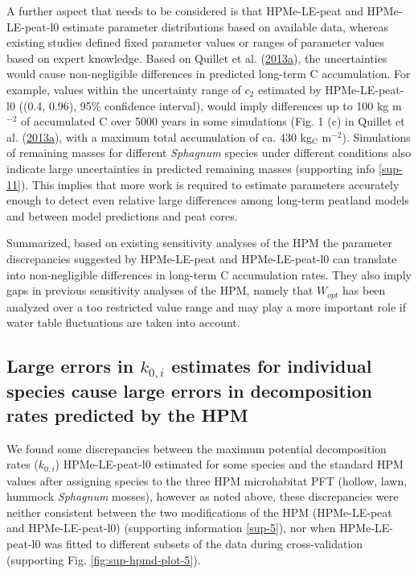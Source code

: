 \documentclass[
  12pt,
]{article}
\begin{document}
A further aspect that needs to be considered is that HPMe-LE-peat and HPMe-LE-peat-l0 estimate parameter distributions based on available data, whereas existing studies defined fixed parameter values or ranges of parameter values based on expert knowledge. Based on Quillet et al. (\protect\hyperlink{ref-Quillet.2013}{2013a}), the uncertainties would cause non-negligible differences in predicted long-term C accumulation. For example, values within the uncertainty range of \(c_2\) estimated by HPMe-LE-peat-l0 ((0.4, 0.96), 95\% confidence interval), would imply differences up to 100 kg m\(^{-2}\) of accumulated C over 5000 years in some simulations (Fig. 1 (c) in Quillet et al. (\protect\hyperlink{ref-Quillet.2013}{2013a}), with a maximum total accumulation of ca. 430 kg\(_\text{C}\) m\(^{-2}\)). Simulations of remaining masses for different \emph{Sphagnum} species under different conditions also indicate large uncertainties in predicted remaining masses (supporting info \ref{sup-11}). This implies that more work is required to estimate parameters accurately enough to detect even relative large differences among long-term peatland models and between model predictions and peat cores.

Summarized, based on existing sensitivity analyses of the HPM the parameter discrepancies suggested by HPMe-LE-peat and HPMe-LE-peat-l0 can translate into non-negligible differences in long-term C accumulation rates. They also imply gaps in previous sensitivity analyses of the HPM, namely that \(W_{opt}\) has been analyzed over a too restricted value range and may play a more important role if water table fluctuations are taken into account.

\hypertarget{out-discussion-7}{%
\subsection{\texorpdfstring{Large errors in \(k_{0,i}\) estimates for individual species cause large errors in decomposition rates predicted by the HPM}{Large errors in k\_\{0,i\} estimates for individual species cause large errors in decomposition rates predicted by the HPM}}\label{out-discussion-7}}

We found some discrepancies between the maximum potential decomposition rates (\(k_{0,i}\)) HPMe-LE-peat-l0 estimated for some species and the standard HPM values after assigning species to the three HPM microhabitat PFT (hollow, lawn, hummock \emph{Sphagnum} mosses), however as noted above, these discrepancies were neither consistent between the two modifications of the HPM (HPMe-LE-peat and HPMe-LE-peat-l0) (supporting information \ref{sup-5}), nor when HPMe-LE-peat-l0 was fitted to different subsets of the data during cross-validation (supporting Fig. \ref{fig:sup-hpmd-plot-5}).
\end{document}
